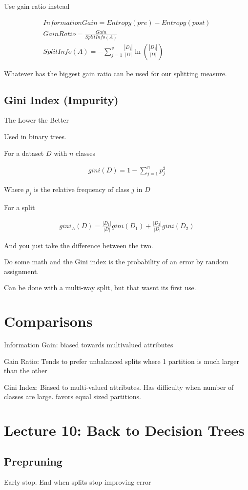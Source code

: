 \documentclass[fleqn]{report}
\newcommand{\equations} [1] {
\begin{gather*}
#1
\end{gather*}
}
\begin{document}
Use gain ratio instead 

\equations{
    Information Gain 
    =
    Entropy(pre) - Entropy(post)
    \\
    Gain Ratio 
    =
    \frac{Gain}{Split Info(A)}
    \\
    SplitInfo(A)
    =
    - \sum^v_{j =1}
    \frac{|D_j|}{|D|}
    \ln(\frac{|D_j|}{|D|})
}

Whatever has the biggest gain ratio can be used for our splitting 
measure.

\subsection{Gini Index (Impurity)}
The Lower the Better 

Used in binary trees. 

For a dataset $D$ with $n$ classes 
\equations{
    gini(D)
    =
    1 - \sum^n_{j=1} p_j^2
}
Where $p_j$ is the relative frequency of class $j$ in $D$ 

For a split 
\equations{
    gini_A(D)
    =
    \frac{|D_1|}{|D|}
    gini(D_1)
    +
    \frac{|D_2|}{|D|}
    gini(D_2)
}

And you just take the difference between the two.

Do some math and the Gini index is the probability of an error by 
random assignment.

Can be done with a multi-way split, but that wasnt its first use.

\section{Comparisons}
Information Gain: 
biased towards multivalued attributes 

Gain Ratio: 
Tends to prefer unbalanced splits where 1 partition is much 
larger than the other 

Gini Index: 
Biased to multi-valued attributes. Has difficulty when 
number of classes are large. 
favors equal sized partitions.

\section{Lecture 10: Back to Decision Trees}
\subsection{Prepruning}
Early stop. End when splits stop improving error 
\end{document}
